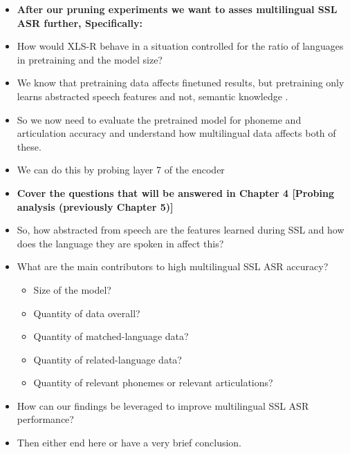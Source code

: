 \begin{itemize}
    \item \textbf{After our pruning experiments we want to asses multilingual SSL ASR further, Specifically:}
    \item How would XLS-R behave in a situation controlled for the ratio of languages in pretraining and the model size?
    \item We know that pretraining data affects finetuned results, but pretraining only learns abstracted speech features and not, semantic knowledge \cite{pasad2021layer}.
    \item So we now need to evaluate the pretrained model for phoneme and articulation accuracy and understand how multilingual data affects both of these.
    \item We can do this by probing layer 7 of the encoder \cite{english2022domain}
    \item \textbf{Cover the questions that will be answered in Chapter 4 [Probing analysis (previously Chapter 5)]}
    \item So, how abstracted from speech are the features learned during SSL and how does the language they are spoken in affect this?
    \item What are the main contributors to high multilingual SSL ASR accuracy?
    \begin{itemize}
        \item Size of the model?
        \item Quantity of data overall?
        \item Quantity of matched-language data?
        \item Quantity of related-language data?
        \item Quantity of relevant phonemes or relevant articulations?
    \end{itemize}
    \item How can our findings be leveraged to improve multilingual SSL ASR performance?
    
    \item Then either end here or have a very brief conclusion.
\end{itemize}
